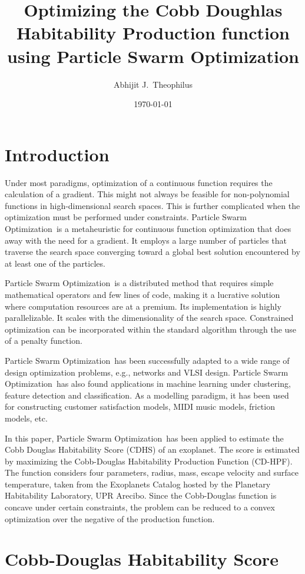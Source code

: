 \documentclass{article}
\title{Optimizing the Cobb Doughlas Habitability Production function using
Particle Swarm Optimization}
\author{Abhijit J.\ Theophilus}
\date{\today}
\newcommand{\pso}{Particle Swarm Optimization}
\begin{document}
\maketitle

\section{Introduction}
Under most paradigms, optimization of a continuous function requires the calculation of a gradient. This might not
always be feasible for non-polynomial functions in high-dimensional search spaces. This is further complicated when the
optimization must be performed under constraints. \pso\ is a metaheuristic for continuous function optimization that does
away with the need for a gradient. It employs a large number of particles that traverse the search space converging
toward a global best solution encountered by at least one of the particles.

\pso\ is a distributed method that requires simple mathematical operators and few lines of code, making it a lucrative
solution where computation resources are at a premium. Its implementation is highly parallelizable. It scales with the
dimensionality of the search space. Constrained optimization can be incorporated within the standard algorithm through
the use of a penalty function.

\pso\ has been successfully adapted to a wide range of design optimization problems, e.g., networks and VLSI design.
\pso\ has also found applications in machine learning under clustering, feature detection and classification.  As a
modelling paradigm, it has been used for constructing customer satisfaction models, MIDI music models, friction models,
etc.

In this paper, \pso\ has been applied to estimate the Cobb Douglas Habitability Score (CDHS) of an exoplanet. The score
is estimated by maximizing the Cobb-Douglas Habitability Production Function (CD-HPF). The function considers four
parameters, radius, mass, escape velocity and surface temperature, taken from the Exoplanets Catalog hosted by the
Planetary Habitability Laboratory, UPR Arecibo. Since the Cobb-Douglas function is concave under certain constraints,
the problem can be reduced to a convex optimization over the negative of the production function.


\section{Cobb-Douglas Habitability Score}
\end{document}
